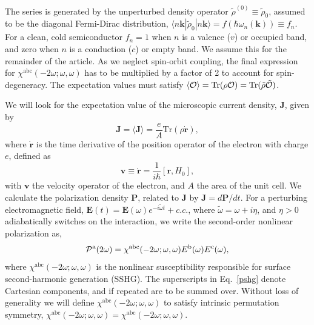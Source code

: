 \documentclass[floatfix,prb,aps,superscriptaddress,showpacs,11pt,preprint,letterpaper]{revtex4}
\begin{document}
The series is generated by the unperturbed density operator $\tilde{\rho}^{(0)}
\equiv \tilde{\rho}_{0}$, assumed to be the diagonal Fermi-Dirac distribution, 
$\langle n\mathbf{k}|\tilde{\rho}_{0}|n\mathbf{k}\rangle = 
f(\hbar\omega_{n}(\mathbf{k}))\equiv f_{n}$. For a clean, cold semiconductor 
$f_{n}=1$ when $n$ is a valence ($v$) or occupied band, and zero when $n$ is 
a conduction ($c$) or empty band. 
We assume this for the remainder of the  
article.  
As we neglect spin-orbit coupling, the
final expression for
$\chi^{\mathrm{a}\mathrm{b}\mathrm{c}}(-2\omega;\omega,\omega)$   
has to be multiplied by a factor of 2
to account for spin-degeneracy.
The expectation values must satisfy
$\langle{\cal O}\rangle = \mbox{Tr}({\rho}{\cal O}) = 
\mbox{Tr}(\tilde{\rho}\tilde{\cal O})$.  

We will look for the expectation value of the microscopic current density, 
$\mathbf{J}$, given by 
\begin{equation*}
\mathbf{J} = \langle{\mathbf{J}}\rangle 
           = \frac{e}{A}\mbox{Tr}({\rho}\dot{\mathbf{r}}),
\end{equation*}
where $\dot{\mathbf{r}}$ is the time derivative of the position operator of the
electron with charge $e$, defined as
\begin{equation}
\mathbf{v}\equiv \dot{\mathbf{r}}=\frac{1}{i\hbar }[\mathbf{r},H_0],  
\label{mv}
\end{equation}
with $\mathbf{v}$ the velocity operator of the electron, and $A$ the
area of the unit cell. We calculate the polarization density 
$\mathbf{P}$, related to $\mathbf{J}$ by
$\mathbf{J}=d\mathbf{P}/dt$. For a 
perturbing electromagnetic field, $\mathbf{E}(t)=
\mathbf{E}(\omega )e^{-i\tilde{\omega} t}+c.c.$,
where $\tilde\omega=\omega+i\eta $,
and $\eta >0$ adiabatically switches on the interaction,
we write the second-order nonlinear
polarization as, 
\begin{equation}
{\mathbf{\cal P}}^{\mathrm{a}}(2\omega)=
\chi^{\mathrm{a}\mathrm{b}\mathrm{c}}(-2\omega;\omega,\omega)
E^{\mathrm{b}}(\omega)E^{\mathrm{c}}(\omega),  
\label{pshg}
\end{equation}
where $\chi^{\mathrm{a}\mathrm{b}\mathrm{c}}(-2\omega ;\omega ,\omega )$ is the nonlinear
susceptibility responsible for surface second-harmonic generation
(SSHG). 
The 
superscripts in Eq.~\eqref{pshg} denote Cartesian components, and if
repeated are to be summed over. Without loss of generality we will
define $\chi^{\mathrm{a}\mathrm{b}\mathrm{c}}(-2\omega;\omega,\omega)$
 to satisfy intrinsic permutation
symmetry, 
$\chi^{\mathrm{a}\mathrm{b}\mathrm{c}}(-2\omega ;\omega ,\omega )
=\chi^{\mathrm{a}\mathrm{b}\mathrm{c}}(-2\omega ;\omega,\omega )$.
\end{document}
